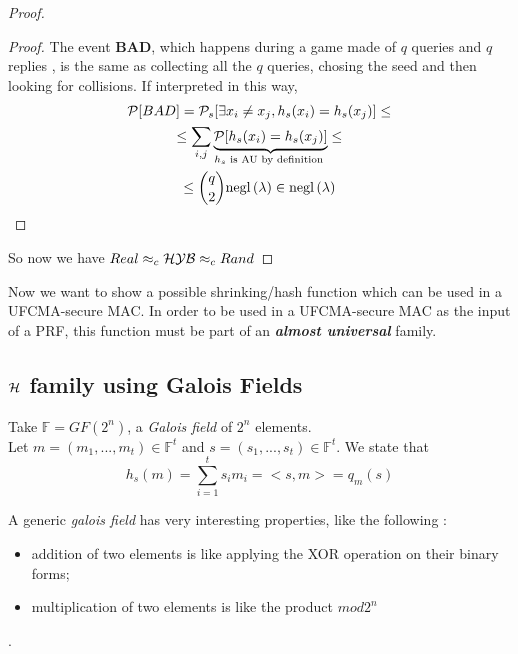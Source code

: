 \begin{proof}
\begin{proof}
    The event \textbf{BAD}, which happens during a game made of $q$ queries and
    $q$ replies ,  is the same as collecting all the $q$ queries, chosing the
    seed and then looking for collisions. If interpreted in this way, 
    \begin{gather*}
        \mathcal{P} [ BAD ] = \mathcal{P}_{s} [ \exists x_{i}\not=x_{j}, h_{s}(x_{i})=
        h_{s}(x_{j})] \leq \\
        \leq \sum_{i,j} \underbrace{\mathcal{P} [ h_{s}(x_{i})=h_{s}(x_{j})
        ]}_{h_{s}\text{ is AU by definition }} \leq \\
        \leq {q \choose 2} \mathrm{negl}\left({\lambda}\right) \in \mathrm{negl}\left({\lambda}\right)    
    \end{gather*}

\end{proof}

So now we have $Real \approx_{c} \mathcal{H}\mathcal{Y}\mathcal{B} \approx_{c} Rand$
 \end{proof}
    
 Now we want to show a possible shrinking/hash function which can be used in a
 UFCMA-secure MAC. In order to be used in a UFCMA-secure MAC as the input of a
 PRF, this function must be part of an \textbf{\textit{almost universal}} family.

 \subsection{$\mathcal{H}$ family using Galois Fields}
 \begin{construction}
     Take $ \mathbb{F}=GF(2^{n})$, a \textit{Galois field} of $2^{n}$
     elements.\\
     Let $m=(m_{1}, ..., m_{t}) \in \mathbb{F}^{t} $ and $s=(s_{1}, ...,
     s_{t}) \in \mathbb{F}^{t} $. We state that 
     \[
         h_{s}(m)= \sum_{i=1}^{t}s_{i}m_{i}=<s,m>=q_{m}(s)
        \]
 \end{construction}

 A generic \textit{galois field} has very interesting properties, like the
 following :
 \begin{itemize}
     \item addition of two elements is like applying the XOR operation on their
         binary forms;
     \item multiplication of two elements is like the product $mod 2^{n}$
 \end{itemize}.

